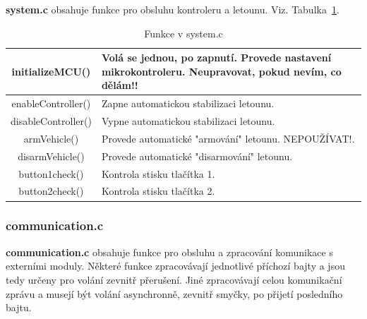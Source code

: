 \documentclass[11pt, a4paper]{article}
\begin{document}
\textbf{system.c} obsahuje funkce pro obsluhu kontroleru a letounu. Viz. Tabulka~\ref{tab:system.c}.

\begin{table}
\begin{center}
\begin{tabular}{| c | p{8cm} |}
\hline
initializeMCU() & Volá se jednou, po zapnutí. Provede nastavení mikrokontroleru.
\newline \textbf{Neupravovat, pokud nevím, co dělám!!}\\
\hline
enableController() & Zapne automatickou stabilizaci letounu.\\
\hline
disableController() & Vypne automatickou stabilizaci letounu.\\
\hline
armVehicle() & Provede automatické "armování" letounu. NEPOUŽÍVAT!.\\
\hline
disarmVehicle() & Provede automatické "disarmování" letounu.\\
\hline
button1check() & Kontrola stisku tlačítka 1.\\
\hline
button2check() & Kontrola stisku tlačítka 2.\\
\hline
\end{tabular}
\caption{Funkce v system.c}
\label{tab:system.c}
\end{center}
\end{table}

\subsubsection{communication.c}

\textbf{communication.c} obsahuje funkce pro obsluhu a zpracování komunikace s externími moduly. Některé funkce zpracovávají jednotlivé příchozí bajty a jsou tedy určeny pro volání zevnitř přerušení. Jiné zpracovávají celou komunikační zprávu a musejí být volání asynchronně, zevnitř smyčky, po přijetí posledního bajtu.
\end{document}
